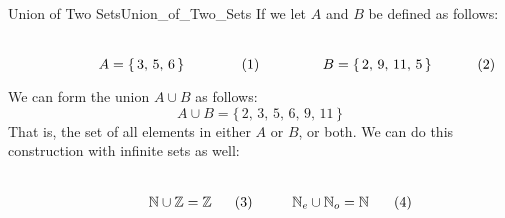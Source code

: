         \begin{lexample}{Union of Two Sets}{Union_of_Two_Sets}
            If we let $A$ and $B$ be defined as follows:
            \par
            \begin{subequations}
                \begin{minipage}[b]{0.49\textwidth}
                    \centering
                    \begin{equation}
                        A=\{\,3,\,5,\,6\,\}
                    \end{equation}
                \end{minipage}
                \hfill
                \begin{minipage}[b]{0.49\textwidth}
                    \centering
                    \begin{equation}
                        B=\{\,2,\,9,\,11,\,5\,\}
                    \end{equation}
                \end{minipage}
            \end{subequations}
            \par\vspace{2.5ex}
            We can form the union $A\cup{B}$ as follows:
            \begin{equation}
                A\cup{B}=\{\,2,\,3,\,5,\,6,\,9,\,11\,\}
            \end{equation}
            That is, the set of all elements in either $A$ or $B$, or both.
            We can do this construction with infinite sets as well:
            \par
            \begin{subequations}
                \begin{minipage}[b]{0.30\textwidth}
                    \centering
                    \begin{equation}
                        \mathbb{N}\cup\mathbb{Z}=\mathbb{Z}
                    \end{equation}
                \end{minipage}
                \hspace{0.03\textwidth}
                \begin{minipage}[b]{0.30\textwidth}
                    \centering
                    \begin{equation}
                        \mathbb{N}_{e}\cup\mathbb{N}_{o}=\mathbb{N}
                    \end{equation}

\end{minipage}
\end{subequations}
\end{lexample}
